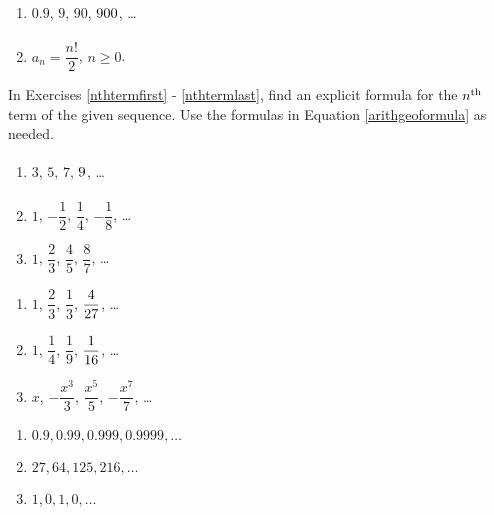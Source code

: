 \begin{multicols}{2}
\begin{enumerate}
\setcounter{enumi}{\value{HW}}

\item  $0.9$, $9$, $90$, $900 \vphantom{a_{n} = \dfrac{n!}{2}}$, \ldots

\item  $a_{n} = \dfrac{n!}{2}$, $n \geq 0$.  \label{alggeoneithlast}


\setcounter{HW}{\value{enumi}}
\end{enumerate}
\end{multicols}


In Exercises \ref{nthtermfirst} - \ref{nthtermlast}, find an explicit formula for the $n^{\mbox{\scriptsize th}}$ term of the given sequence.  Use the formulas in Equation \ref{arithgeoformula} as needed.

\begin{multicols}{3}
\begin{enumerate}
\setcounter{enumi}{\value{HW}}

\item $3$, $5$, $7$, $9 \vphantom{-\dfrac{1}{8}}$, \ldots \label{nthtermfirst}
\item $1$, $-\dfrac{1}{2}$, $\dfrac{1}{4}$, $-\dfrac{1}{8}$, \ldots
\item $1$, $\dfrac{2}{3}$, $\dfrac{4}{5}$, $\dfrac{8}{7}$, \ldots

\setcounter{HW}{\value{enumi}}
\end{enumerate}
\end{multicols}

\begin{multicols}{3}
\begin{enumerate}
\setcounter{enumi}{\value{HW}}

\item $1$, $\dfrac{2}{3}$, $\dfrac{1}{3}$, $\dfrac{4}{27} \vphantom{\dfrac{x^7}{7}}$, \ldots
\item $1$, $\dfrac{1}{4}$, $\dfrac{1}{9}$, $\dfrac{1}{16} \vphantom{-\dfrac{x^7}{7}}$, \ldots
\item $x$, $-\dfrac{x^3}{3}$, $\dfrac{x^5}{5}$, $-\dfrac{x^7}{7}$, \ldots

\setcounter{HW}{\value{enumi}}
\end{enumerate}
\end{multicols}

\begin{multicols}{3}
\begin{enumerate}
\setcounter{enumi}{\value{HW}}


\item $0.9, 0.99, 0.999, 0.9999, \ldots$
\item $27, 64, 125, 216, \ldots$
\item $1, 0, 1, 0, \ldots$ \label{nthtermlast}

\setcounter{HW}{\value{enumi}}
\end{enumerate}
\end{multicols}


